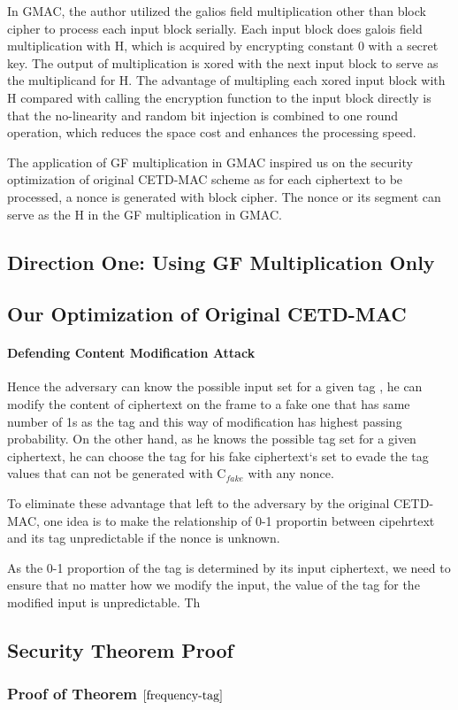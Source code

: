 \documentclass{article}
\begin{document}
In GMAC, the author utilized the galios field multiplication other than block
cipher to process each input block serially. Each input block does galois field
multiplication with H, which is acquired by encrypting constant 0 with a secret
key. The output of multiplication is xored with the next input block to serve as
the multiplicand for H. The advantage of multipling each xored input block with
H compared with calling the encryption function to the input block directly is
that the no-linearity and random bit injection is combined to one round
operation, which reduces the space cost and enhances the processing speed.

The application of GF multiplication in GMAC inspired us on the security
optimization of original CETD-MAC scheme as for each ciphertext to be processed,
a nonce is generated with block cipher. The nonce or its segment can serve as
the H in the GF multiplication in GMAC. 
\subsection{Direction One: Using GF Multiplication Only}
\subsection{Our Optimization of Original CETD-MAC}
\paragraph{Defending Content Modification Attack}
Hence the adversary can know the possible input set for a given tag , he can modify the content of ciphertext on the frame to a fake one that has same number of 1s as the tag and this way of modification has highest passing probability. On the other hand, as he knows the possible tag set for a given ciphertext, he can choose the tag for his fake ciphertext`s set to evade the tag values that can not be generated with C$_{fake}$ with any nonce. 

To eliminate these advantage that left to the adversary by the original CETD-MAC, one idea is to make the relationship of 0-1 proportin between cipehrtext and its tag unpredictable if the nonce is unknown. 

As the 0-1 proportion of the tag is determined by its input ciphertext, we need to ensure that no matter how we modify the input, the value of the tag for the modified input is unpredictable. Th 




\appendix
\subsection{Security Theorem Proof}
\subsubsection{Proof of Theorem $\ref{frequency-tag}$}
\end{document}
